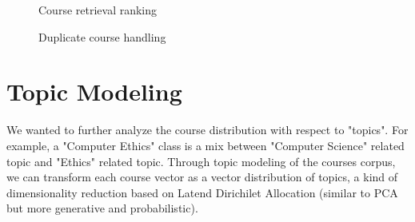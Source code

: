 \documentclass[twoside]{article}
\begin{document}
\begin{figure}
    \centering
    \qquad
    \caption{Course retrieval ranking} %
    \label{fig:comp1}%
\end{figure}


\begin{figure}
    \centering
    \qquad
    \caption{Duplicate course handling} %
    \label{fig:comp1}%
\end{figure}

\vfill
\pagebreak

\section{Topic Modeling}

We wanted to further analyze the course distribution with respect to "topics". For example, a "Computer Ethics" class is a mix between "Computer Science" related topic and "Ethics" related topic. Through topic modeling of the courses corpus, we can transform each course vector as a vector distribution of topics, a kind of dimensionality reduction based on Latend Dirichilet Allocation (similar to PCA but more generative and probabilistic).
\end{document}
